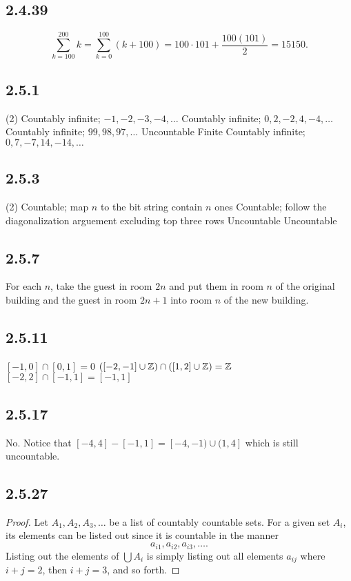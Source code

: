 \documentclass[12pt,titlepage]{extarticle}
\begin{document}
\subsection*{2.4.39}
\[
    \sum_{k=100}^{200} k = \sum_{k=0}^{100} (k+100) = 100 \cdot 101 + \frac{100(101)}{2} = 15150
.\]

\subsection*{2.5.1}
\begin{tasks}(2)
    \task Countably infinite; $−1, −2, −3, −4, \ldots$
    \task Countably infinite; $0, 2, -2, 4, -4,\ldots$
    \task Countably infinite; $99, 98, 97, \ldots$
    \task Uncountable 
    \task Finite 
    \task Countably infinite; $0, 7, −7, 14, −14, \ldots$
\end{tasks}

\subsection*{2.5.3}
\begin{tasks}(2)
    \task Countable; map $n$ to the bit string contain $n$ ones
    \task Countable; follow the diagonalization arguement excluding top three rows
    \task Uncountable 
    \task Uncountable
\end{tasks}

\subsection*{2.5.7}
For each $n$, take the guest in room $2n$ and put them in room $n$ of the original building and the guest in room $2n + 1$ into room $n$ of the new building.

\subsection*{2.5.11}
\begin{tasks}
    \task $[-1,0] \cap [0,1] = \qty{0}$
    \task $([-2,-1] \cup \mathbb{Z}) \cap ([1,2] \cup \mathbb{Z}) = \mathbb{Z}$
    \task $[-2, 2] \cap [-1, 1] = [-1, 1]$
\end{tasks}

\subsection*{2.5.17}
No. Notice that $[-4, 4] - [-1, 1] = [-4, -1) \cup (1, 4]$ which is still uncountable.

\subsection*{2.5.27}
\begin{proof}
    Let $A_1, A_2, A_3, \ldots$ be a list of countably countable sets. For a given set $A_i$, its elements can be listed out since it is countable in the manner
    \[
        a_{i1}, a_{i 2}, a_{i 3}, \ldots
    .\]
    Listing out the elements of $\bigcup A_i$ is simply listing out all elements $a_{ij}$ where $i + j = 2$, then $i + j = 3$, and so forth.
\end{proof}
\end{document}
